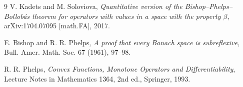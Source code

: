 \documentclass[11pt]{article}
\begin{document}
\begin{thebibliography}{9}
V. Kadets and M. Soloviova,
\emph{Quantitative version of the Bishop--Phelps--Bollob\'as theorem for
operators with values in a space with the property $\beta$},
arXiv:1704.07095 [math.FA], 2017.

E. Bishop and R. R. Phelps,
\emph{A proof that every Banach space is subreflexive},
Bull. Amer. Math. Soc. 67 (1961), 97--98.

R. R. Phelps,
\emph{Convex Functions, Monotone Operators and Differentiability},
Lecture Notes in Mathematics 1364, 2nd ed., Springer, 1993.
\end{thebibliography}
\end{document}
